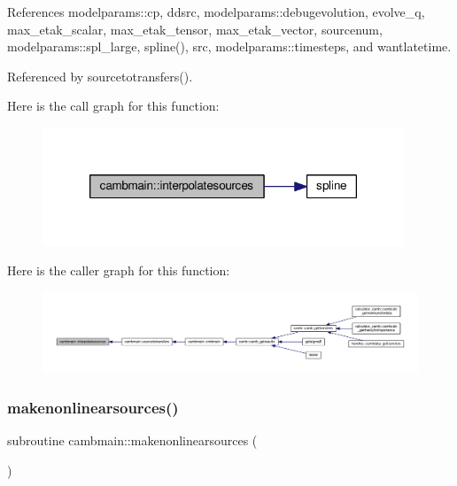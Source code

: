 References modelparams\+::cp, ddsrc, modelparams\+::debugevolution, evolve\+\_\+q, max\+\_\+etak\+\_\+scalar, max\+\_\+etak\+\_\+tensor, max\+\_\+etak\+\_\+vector, sourcenum, modelparams\+::spl\+\_\+large, spline(), src, modelparams\+::timesteps, and wantlatetime.



Referenced by sourcetotransfers().

Here is the call graph for this function\+:
\nopagebreak
\begin{figure}[H]
\begin{center}
\leavevmode
\includegraphics[width=306pt]{namespacecambmain_a7e1e9bb292a8b4d778e9b8d218ee4036_cgraph}
\end{center}
\end{figure}
Here is the caller graph for this function\+:
\nopagebreak
\begin{figure}[H]
\begin{center}
\leavevmode
\includegraphics[width=350pt]{namespacecambmain_a7e1e9bb292a8b4d778e9b8d218ee4036_icgraph}
\end{center}
\end{figure}
\mbox{\label{namespacecambmain_a5b302c437be8bf6d127dc65f638778c8}} 
\subsubsection{\texorpdfstring{makenonlinearsources()}{makenonlinearsources()}}
{\footnotesize\ttfamily subroutine cambmain\+::makenonlinearsources (\begin{DoxyParamCaption}{ }\end{DoxyParamCaption})\hspace{0.3cm}{\ttfamily [private]}}



